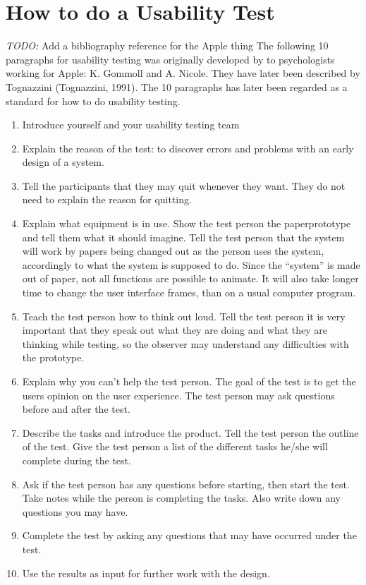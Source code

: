 \section{How to do a Usability Test}
\emph{TODO:} Add a bibliography reference for the Apple thing
The following 10 paragraphs for usability testing was originally developed by to psychologists working for Apple: K. Gommoll and A. Nicole. They have later been described by Tognazzini (Tognazzini, 1991).
The 10 paragraphs has later been regarded as a standard for how to do usability testing.
\begin{enumerate}
	\item Introduce yourself and your usability testing team
	\item Explain the reason of the test: to discover errors and problems with an early design of a system.
	\item Tell the participants that they may quit whenever they want. They do not need to explain the reason for quitting.
	\item Explain what equipment is in use. Show the test person the paperprototype and tell them what it should imagine. Tell the test person that the system will work by papers being changed out as the person uses the system, accordingly to what the system is supposed to do. Since the ``system'' is made out of paper, not all functions are possible to animate. It will also take longer time to change the user interface frames, than on a usual computer program.
	\item Teach the test person how to think out loud. Tell the test person it is very important that they speak out what they are doing and what they are thinking while testing, so the observer may understand any difficulties with the prototype. 
	\item Explain why you can't help the test person. The goal of the test is to get the users opinion on the user experience. The test person may ask questions before and after the test.
	\item Describe the tasks and introduce the product. Tell the test person the outline of the test. Give the test person a list of the different tasks he/she will complete during the test. 
	\item Ask if the test person has any questions before starting, then start the test. Take notes while the person is completing the tasks. Also write down any questions you may have.
	\item Complete the test by asking any questions that may have occurred under the test. 
	\item Use the results as input for further work with the design.
\end{enumerate}